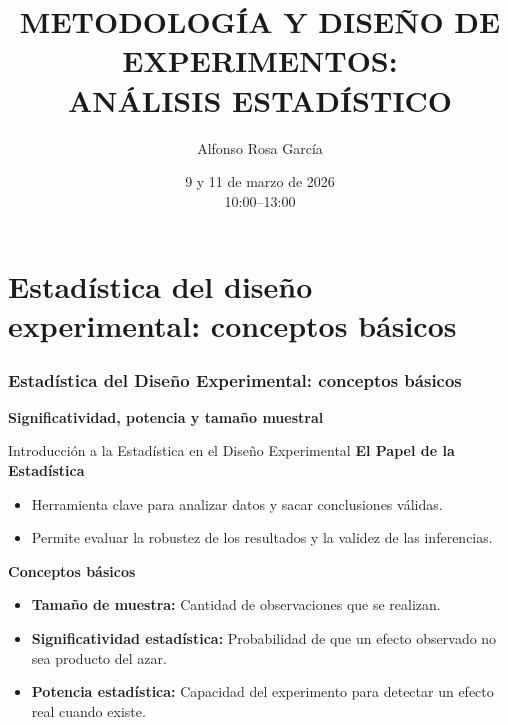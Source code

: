 ﻿\documentclass{beamer}
\title[DISEÑO DE EXPERIMENTOS]{METODOLOGÍA Y DISEÑO DE EXPERIMENTOS: \\  ANÁLISIS ESTADÍSTICO}
\author[Alfonso Rosa García]{Alfonso Rosa García }
\institute[G9]{\textbf{Grupo de Universidades G-9}}
\date{9 y 11 de marzo de 2026 \\ 10:00--13:00}
\begin{document}
\begin{frame}
  \titlepage
\end{frame}



\section{Estadística del diseño experimental: conceptos básicos}
\begin{frame}
    \frametitle{Estadística del Diseño Experimental: conceptos básicos}
    \centering
    \textbf{\Large Significatividad, potencia y tamaño muestral}
    \vspace{0.5cm}
\end{frame}


\begin{frame}{Introducción a la Estadística en el Diseño Experimental}
    \textbf{El Papel de la Estadística}
    \begin{itemize}
        \item Herramienta clave para analizar datos y sacar conclusiones válidas.
        \item Permite evaluar la robustez de los resultados y la validez de las inferencias.
    \end{itemize}

    \textbf{Conceptos básicos}
    \begin{itemize}
        \item \textbf{Tamaño de muestra:} Cantidad de observaciones que se realizan.
        \item \textbf{Significatividad estadística:} Probabilidad de que un efecto observado no sea producto del azar.
        \item \textbf{Potencia estadística:} Capacidad del experimento para detectar un efecto real cuando existe.
    \end{itemize}
\end{frame}
\end{document}
